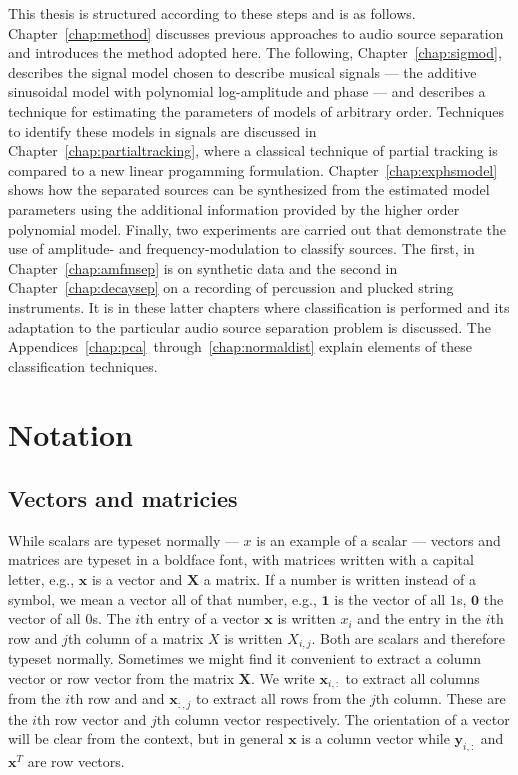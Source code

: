 This thesis is structured according to these steps and is as follows.
Chapter~\ref{chap:method} discusses previous approaches to audio source
separation and introduces the method adopted here. The following,
Chapter~\ref{chap:sigmod}, describes the signal model chosen to describe musical
signals --- the additive sinusoidal model with polynomial log-amplitude and
phase --- and describes a technique for estimating the parameters of models of
arbitrary order. Techniques to identify these models in signals are discussed in
Chapter~\ref{chap:partialtracking}, where a classical technique of partial
tracking is compared to a new linear progamming formulation.
Chapter~\ref{chap:exphsmodel} shows how the separated sources can be synthesized
from the estimated model parameters using the additional information provided by
the higher order polynomial model. Finally, two experiments are carried out that
demonstrate the use of amplitude- and frequency-modulation to classify sources.
The first, in Chapter~\ref{chap:amfmsep} is on synthetic data and the second in
Chapter~\ref{chap:decaysep} on a recording of percussion and plucked string
instruments. It is in these latter chapters where classification is performed
and its adaptation to the particular audio source separation problem is
discussed. The Appendices~\ref{chap:pca}~through~\ref{chap:normaldist} explain
elements of these classification techniques.

\section{Notation}

\subsection{Vectors and matricies}

While scalars are typeset normally --- $x$ is an example of a scalar --- vectors
and matrices are typeset in a boldface font, with matrices written with a
capital letter, e.g., $\boldsymbol{x}$ is a vector and $\boldsymbol{X}$ a
matrix. If a number is written instead of a symbol, we mean a vector all of that
number, e.g., $\boldsymbol{1}$ is the vector of all $1$s, $\boldsymbol{0}$ the
vector of all $0$s. The $i$th entry of a vector $\boldsymbol{x}$ is written
$x_{i}$ and the entry in the $i$th row and $j$th column of a matrix $X$ is
written $X_{i,j}$.  Both are scalars and therefore typeset normally. Sometimes
we might find it convenient to extract a column vector or row vector from the
matrix $\boldsymbol{X}$. We write $\boldsymbol{x}_{i,:}$ to extract all columns
from the $i$th row and and $\boldsymbol{x}_{:,j}$ to extract all rows from the
$j$th column. These are the $i$th row vector and $j$th column vector
respectively. The orientation of a vector will be clear from the context, but in
general $\boldsymbol{x}$ is a column vector while $\boldsymbol{y}_{i,:}$ and
$\boldsymbol{x}^{T}$ are row vectors.


